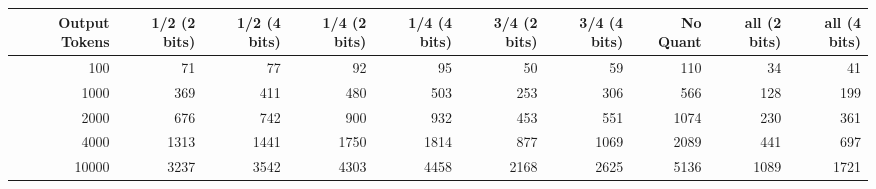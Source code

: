 \begin{tabular}{rrrrrrrrrr}
\toprule
Output Tokens & 1/2 (2 bits) & 1/2 (4 bits) & 1/4 (2 bits) & 1/4 (4 bits) & 3/4 (2 bits) & 3/4 (4 bits) & No Quant & all (2 bits) & all (4 bits) \\
\midrule
100 & 71 & 77 & 92 & 95 & 50 & 59 & 110 & 34 & 41 \\
1000 & 369 & 411 & 480 & 503 & 253 & 306 & 566 & 128 & 199 \\
2000 & 676 & 742 & 900 & 932 & 453 & 551 & 1074 & 230 & 361 \\
4000 & 1313 & 1441 & 1750 & 1814 & 877 & 1069 & 2089 & 441 & 697 \\
10000 & 3237 & 3542 & 4303 & 4458 & 2168 & 2625 & 5136 & 1089 & 1721 \\
\bottomrule
\end{tabular}
